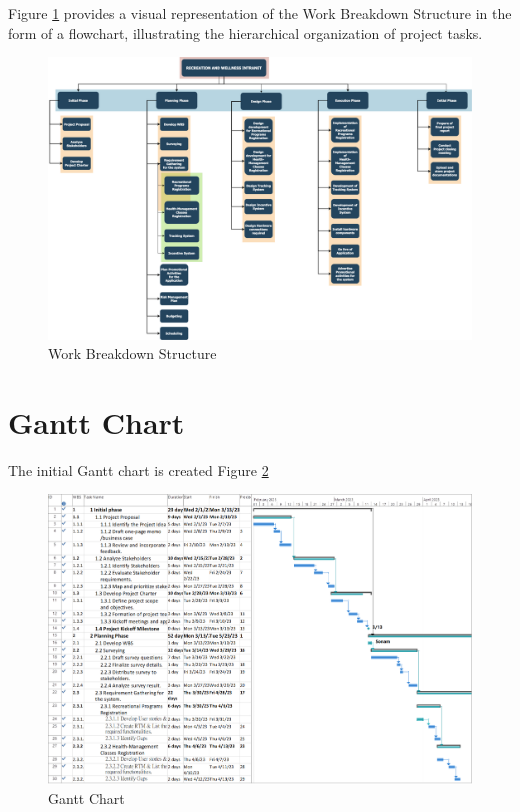 Figure \ref{fig:wbs} provides a visual representation of the Work Breakdown Structure in the form of a flowchart, illustrating the hierarchical organization of project tasks.


\begin{figure}[ht]
    \includegraphics[width=\textwidth]{images/wbs.png}
    \caption{Work Breakdown Structure}
    \label{fig:wbs}
\end{figure}

\section{Gantt Chart}

The initial Gantt chart is created Figure \ref{fig:gnt1}

\begin{figure}[ht]
    \includegraphics[width=\textwidth]{images/gant.png}
    \caption{Gantt Chart}
    \label{fig:gnt1}
\end{figure}